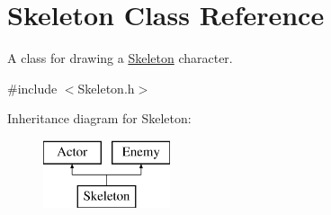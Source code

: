 \hypertarget{classSkeleton}{}\section{Skeleton Class Reference}
\label{classSkeleton}


A class for drawing a \mbox{\hyperlink{classSkeleton}{Skeleton}} character.  




{\ttfamily \#include $<$Skeleton.\+h$>$}

Inheritance diagram for Skeleton\+:\begin{figure}[H]
\begin{center}
\leavevmode
\includegraphics[height=2.000000cm]{classSkeleton}
\end{center}
\end{figure}

